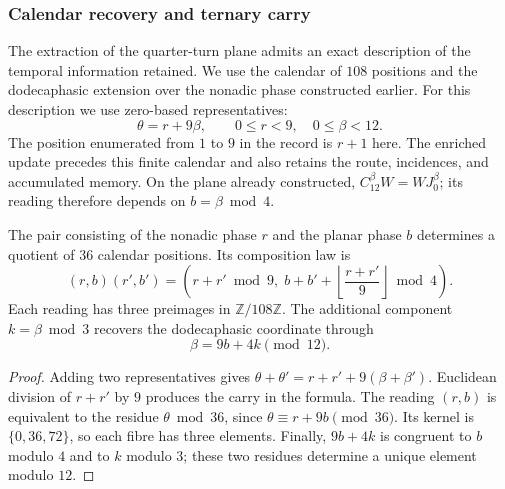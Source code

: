 \subsubsection{Calendar recovery and ternary carry}
\label{ins29:xii:acarreo}

The extraction of the quarter-turn plane admits an exact description
of the temporal information retained. We use the calendar of
\(108\) positions and the dodecaphasic extension over the nonadic phase
constructed earlier. For this description we use zero-based representatives:
\[
 \theta=r+9\beta,\qquad 0\leq r<9,\quad 0\leq\beta<12.
\]
The position enumerated from \(1\) to \(9\) in the record is \(r+1\) here.
The enriched update precedes this finite calendar and also retains
the route, incidences, and accumulated memory. On the plane already
constructed, \(C_{12}^{\beta}W=WJ_0^{\beta}\); its reading therefore
depends on \(b=\beta\bmod4\).

\begin{proposition}
\label{ins29:xii:fibra}
The pair consisting of the nonadic phase \(r\) and the planar phase \(b\)
determines a quotient of \(36\) calendar positions. Its composition law is
\[
 (r,b)(r',b')=
 \left(r+r'\bmod9,\;
 b+b'+\left\lfloor\frac{r+r'}9\right\rfloor\bmod4\right).
\]
Each reading has three preimages in \(\mathbb Z/108\mathbb Z\).
The additional component \(k=\beta\bmod3\) recovers the dodecaphasic
coordinate through
\[
 \beta=9b+4k\pmod{12}.
\]
\end{proposition}
\begin{proof}
Adding two representatives gives
\(\theta+\theta'=r+r'+9(\beta+\beta')\). Euclidean division of
\(r+r'\) by \(9\) produces the carry in the formula. The reading
\((r,b)\) is equivalent to the residue \(\theta\bmod36\), since
\(\theta\equiv r+9b\pmod{36}\). Its kernel is
\(\{0,36,72\}\), so each fibre has three elements.
Finally, \(9b+4k\) is congruent to \(b\) modulo \(4\) and to
\(k\) modulo \(3\); these two residues determine a unique element
modulo \(12\).
\end{proof}

